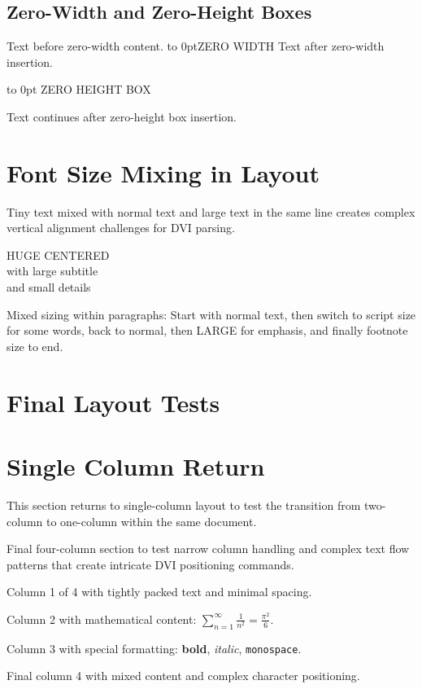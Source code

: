 \documentclass[10pt,twocolumn]{article}
\begin{document}
\lipsum[5]

\subsection{Zero-Width and Zero-Height Boxes}

Text before zero-width content.%
\hbox to 0pt{ZERO WIDTH\hss}%
Text after zero-width insertion.

\vbox to 0pt{%
ZERO HEIGHT BOX
\vss
}%

Text continues after zero-height box insertion.

\section{Font Size Mixing in Layout}

{\tiny Tiny text} mixed with {\normalsize normal text} and {\Large large text} in the same line creates complex vertical alignment challenges for DVI parsing.

\begin{center}
{\Huge HUGE CENTERED}\\
{\large with large subtitle}\\
{\small and small details}
\end{center}

Mixed sizing within paragraphs: Start with normal text, then {\scriptsize switch to script size for some words}, back to normal, then {\LARGE LARGE for emphasis}, and finally {\footnotesize footnote size to end}.

\section{Final Layout Tests}

\onecolumn

\section{Single Column Return}

This section returns to single-column layout to test the transition from two-column to one-column within the same document.

\lipsum[6-7]

\begin{multicols}{4}
Final four-column section to test narrow column handling and complex text flow patterns that create intricate DVI positioning commands.

Column 1 of 4 with tightly packed text and minimal spacing.

\columnbreak

Column 2 with mathematical content: $\sum_{n=1}^{\infty} \frac{1}{n^2} = \frac{\pi^2}{6}$.

\columnbreak

Column 3 with special formatting: \textbf{bold}, \textit{italic}, \texttt{monospace}.

\columnbreak

Final column 4 with mixed content and complex character positioning.
\end{multicols}
\end{document}
